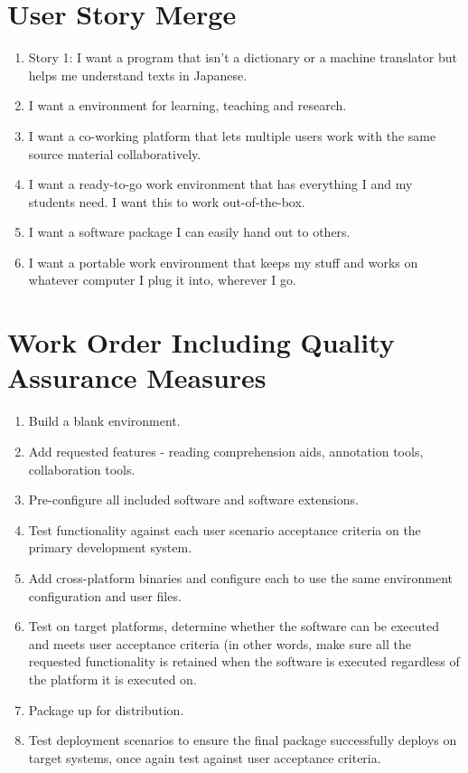 \documentclass{article}
\begin{document}
\section{User Story Merge}
\begin{enumerate}
    \item Story 1: I want a program that isn't a dictionary or a machine translator but helps me understand texts in Japanese.
    \item I want a environment for learning, teaching and research.
    \item I want a co-working platform that lets multiple users work with the same source material collaboratively.
    \item I want a ready-to-go work environment that has everything I and my students need. I want this to work out-of-the-box.
    \item I want a software package I can easily hand out to others.
    \item I want a portable work environment that keeps my stuff and works on whatever computer I plug it into, wherever I go.
\end{enumerate}

\section{Work Order Including Quality Assurance Measures}
\begin{enumerate}
    \item Build a blank environment.
    \item Add requested features - reading comprehension aids, annotation tools, collaboration tools.
    \item Pre-configure all included software and software extensions.
    \item Test functionality against each user scenario acceptance criteria on the primary development system.
    \item Add cross-platform binaries and configure each to use the same environment configuration and user files.
    \item Test on target platforms, determine whether the software can be executed and meets user acceptance criteria (in other words, make sure all the requested functionality is retained when the software is executed regardless of the platform it is executed on.
    \item Package up for distribution.
    \item Test deployment scenarios to ensure the final package successfully deploys on target systems, once again test against user acceptance criteria.
\end{enumerate}
\end{document}
